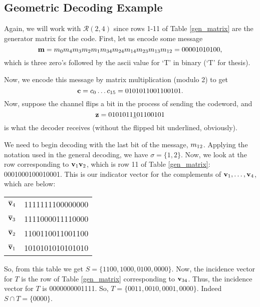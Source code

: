 \documentclass[12pt,twoside]{reedthesis}
\theoremstyle{definition}
\begin{document}
\subsection{Geometric Decoding Example}
Again, we will work with $\mathscr{R}(2,4)$ since rows 1-11 of Table \ref{gen_matrix} are the generator matrix for the code. First, let us encode some message $$ \mathbf{m} = m_{0}m_{4}m_{3}m_{2}m_{1}m_{34}m_{24}m_{14}m_{23}m_{13}m_{12} = 00001010100,$$ which is three zero's followed by the ascii value for `T' in binary (`T' for thesis). 

Now, we encode this message by matrix multiplication (modulo 2) to get $$\mathbf{c} = c_{0} \ldots c_{15} = 0101011001100101.$$ Now, suppose the channel flips a bit in the process of sending the codeword, and $$\mathbf{z} = 0101011\underline{1}01100101$$ is what the decoder receives (without the flipped bit underlined, obviously).

We need to begin decoding with the last bit of the message, $m_{12}$. Applying the notation used in the general decoding, we have $\sigma = \{1,2\}$. Now, we look at the row corresponding to $\mathbf{v}_{1}\mathbf{v}_{2}$, which is row 11 of Table \ref{gen_matrix}: 0001000100010001. This is our indicator vector for the complements of $\mathbf{v}_{1}, \ldots,\mathbf{v}_{4}$, which are below:

\begin{center}
\begin{tabular}{ c | c  }
$\overline{\mathbf{v}}_{4}$ & 1111111100000000\\
$\overline{\mathbf{v}}_{3}$ & 1111000011110000 \\ 
$\overline{\mathbf{v}}_{2}$ & 1100110011001100\\
$\overline{\mathbf{v}}_{1}$ & 1010101010101010 
\end{tabular}
\end{center}
So, from this table we get $S =\{1100, 1000, 0100, 0000\}$. Now, the incidence vector for $T$ is the row of Table \ref{gen_matrix} corresponding to $\mathbf{v}_{34}$. Thus, the incidence vector for $T$ is 0000000001111. So, $T = \{0011,0010, 0001, 0000\}$. Indeed $S \cap T = \{0000\}$. 
\end{document}

